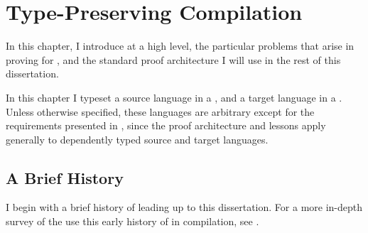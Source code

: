 \renewcommand{\techprefix}{type-pres}

\newcommand{\FigModelDigram}[1][t]{
  \begin{figure}[#1]
    \begin{center}
    \begin{tikzcd}[ampersand replacement=\&]
      \& \text{Source} \arrow[d] \& \\
      \& \text{CPS IL} \arrow[d] \& \text{Front end} \\
      \& \text{Closure Conversion IL} \arrow[d, "-----------------------" description] \& \\
      \& \text{Hoisted IL} \arrow[d] \& \\
      \text{Back end} \& \text{Allocation IL} \arrow[d] \& \\
      \& \text{Assembly} \&
    \end{tikzcd}
    \end{center}
    \caption{Model Type-Preserving Compiler}
    \label{fig:type-pres:f-to-tal}
  \end{figure}
}

\chapter{Type-Preserving Compilation}
\label{chp:type-pres}
In this chapter, I introduce  at a high level,
the particular problems that arise in proving  for
, and the standard proof architecture I will use in the
rest of this dissertation.

\begin{typographical}
  In this chapter I typeset a source language in a \emph{}, and a target language in a
  \emph{}.
  Unless otherwise specified, these languages are arbitrary except for the
  requirements presented in , since the proof architecture
  and lessons apply generally to dependently typed source and target languages.
\end{typographical}

\section{A Brief History}
I begin with a brief history of  leading up to this
dissertation.
For a more in-depth survey of the use this early history of  in
compilation, see \citet[Section 2 and 3]{leroy1998}.

